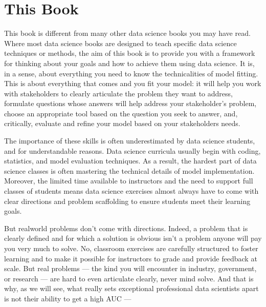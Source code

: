 \documentclass[letterpaper,10pt,english]{jupyterBook}
\begin{document}
\section{This Book}
\label{\detokenize{10_introduction/10_solving_problems_with_data:this-book}}
\sphinxAtStartPar
This book is different from many other data science books you may have read. Where most data science books are designed to teach specific data science techniques or methods, the aim of this book is to provide you with a framework for thinking about your goals and how to achieve them using data science. It is, in a sense, about everything you need to know  the technicalities of model fitting. This is about everything that comes  and  you fit your model: it will help you work with stakeholders to clearly articulate the problem they want to address, formulate questions whose answers will help address your stakeholder’s problem, choose an appropriate tool based on the question you seek to answer, and, critically, evaluate and refine your model based on your stakeholders needs.

\sphinxAtStartPar
The importance of these skills is often underestimated by data science students, and for understandable reasons. Data science curricula usually begin with coding, statistics, and model evaluation techniques. As a result, the hardest part of data science classes is often mastering the technical details of model implementation. Moreover, the limited time available to instructors and the need to support full classes of students means data science exercises almost always have to come with clear directions and problem scaffolding to ensure students meet their learning goals.

\sphinxAtStartPar
But real\sphinxhyphen{}world problems don’t come with directions. Indeed, a problem that is clearly defined and for which a solution is obvious isn’t a problem anyone will pay you very much to solve. No, classroom exercises are carefully structured to foster learning and to make it possible for instructors to grade and provide feedback at scale. But real problems — the kind you will encounter in industry, government, or research — are hard to even articulate clearly, never mind solve. And that is why, as we will see, what really sets exceptional professional data scientists apart is not their ability to get a high AUC — 
\end{document}
